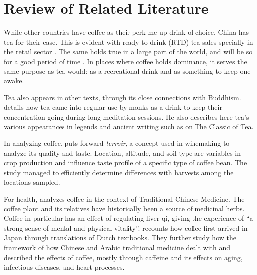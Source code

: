\chapter{Review of Related Literature}\label{chap:rrl}

While other countries have coffee as their perk-me-up drink of choice, China has
tea for their case. This is evident with ready-to-drink (RTD) tea sales
specially in the retail sector
\autocite{international_coffee_council_coffee_2015}. The same holds true in a
large part of the world, and will be so for a good period of time
\autocite{CITEME}. In places where coffee holds dominance, it serves the same
purpose as tea would: as a recreational drink and as something to keep one
awake.


Tea also appears in other texts, through its close connections with Buddhism.
\textcite{kieschnick_impact_2003} details how tea came into regular use by monks
as a drink to keep their concentration going during long meditation sessions. He
also describes here tea's various appearances in legends and ancient writing
such as \textcite{lu_classic_1974} on The Classic of Tea.

In analyzing coffee, \textcite{silva_characterization_2014} puts forward
\emph{terroir}, a concept used in winemaking to analyze its quality and taste.
Location, altitude, and soil type are variables in crop production and influence
taste profile of a specific type of coffee bean. The study managed to
efficiently determine differences with harvests among the locations sampled.



For health, \textcite{dharmananda_coffee_2003} analyzes coffee in the context of
Traditional Chinese Medicine. The coffee plant and its relatives have
historically been a source of medicinal herbs. Coffee in particular has an
effect of regulating liver qi, giving the experience of ``a strong sense of
mental and physical vitality''. \textcite{namba_historical_2001} recounts how
coffee first arrived in Japan through translations of Dutch textbooks. They
further study how the framework of how Chinese and Arabic traditional medicine
dealt with and described the effects of coffee, mostly through caffeine and its
effects on aging, infectious diseases, and heart processes.

